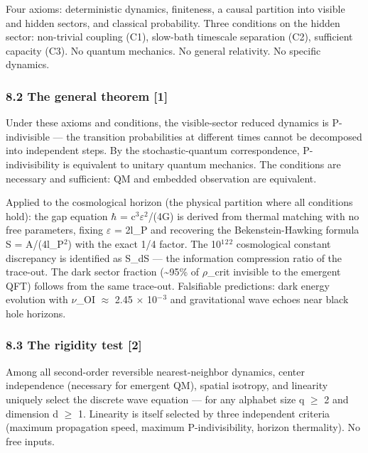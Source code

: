 \documentclass[
  11pt,
]{article}
\begin{document}
Four axioms: deterministic dynamics, finiteness, a causal partition into
visible and hidden sectors, and classical probability. Three conditions
on the hidden sector: non-trivial coupling (C1), slow-bath timescale
separation (C2), sufficient capacity (C3). No quantum mechanics. No
general relativity. No specific dynamics.

\hypertarget{the-general-theorem-1}{%
\subsubsection{8.2 The general theorem
{[}1{]}}\label{the-general-theorem-1}}

Under these axioms and conditions, the visible-sector reduced dynamics
is P-indivisible --- the transition probabilities at different times
cannot be decomposed into independent steps. By the stochastic-quantum
correspondence, P-indivisibility is equivalent to unitary quantum
mechanics. The conditions are necessary and sufficient: QM and embedded
observation are equivalent.

Applied to the cosmological horizon (the physical partition where all
conditions hold): the gap equation \ensuremath{\hbar} = c\ensuremath{^3}\ensuremath{\varepsilon}\ensuremath{^2}/(4G) is derived from thermal
matching with no free parameters, fixing \ensuremath{\varepsilon} = 2l\_P and recovering the
Bekenstein-Hawking formula S = A/(4l\_P\ensuremath{^2}) with the exact 1/4 factor. The
10\ensuremath{^1}\ensuremath{^2}\ensuremath{^2} cosmological constant discrepancy is identified as S\_dS --- the
information compression ratio of the trace-out. The dark sector fraction
(\textasciitilde95\% of \ensuremath{\rho}\_crit invisible to the emergent QFT) follows
from the same trace-out. Falsifiable predictions: dark energy evolution
with \ensuremath{\nu}\_OI \ensuremath{\approx} 2.45 \ensuremath{\times} 10\ensuremath{^{-}}\ensuremath{^3} and gravitational wave echoes near black hole
horizons.

\hypertarget{the-rigidity-test-2}{%
\subsubsection{8.3 The rigidity test
{[}2{]}}\label{the-rigidity-test-2}}

Among all second-order reversible nearest-neighbor dynamics, center
independence (necessary for emergent QM), spatial isotropy, and
linearity uniquely select the discrete wave equation --- for any
alphabet size q \ensuremath{\geq} 2 and dimension d \ensuremath{\geq} 1. Linearity is itself selected by
three independent criteria (maximum propagation speed, maximum
P-indivisibility, horizon thermality). No free inputs.
\end{document}
